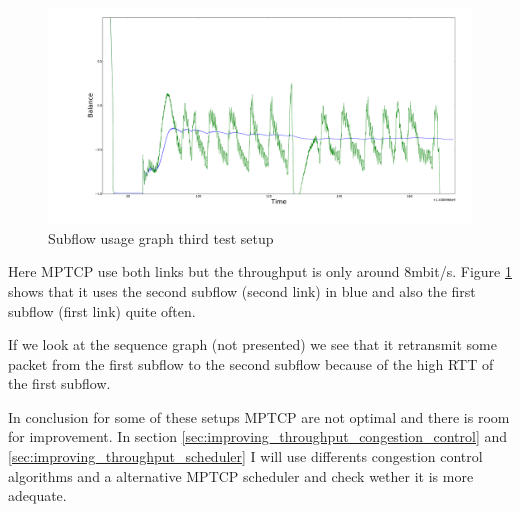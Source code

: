 \begin{figure}[h!]
 \centering
 \includegraphics[width=14cm]{../results/32_8-400_2rtt_seq2.pdf}
 \caption{Subflow usage graph third test setup}
 \label{32_8-400_2rtt_seq}
\end{figure}

Here MPTCP use both links but the throughput is only around 8mbit/s. Figure \ref{32_8-400_2rtt_seq} shows that it uses the second subflow (second link) in blue and
 also the first subflow (first link) quite often.

If we look at the sequence graph (not presented) we see that it retransmit some packet from the first subflow to the second subflow because of the high RTT of the first subflow.

In conclusion for some of these setups MPTCP are not optimal and there is room for improvement.
In section \ref{sec:improving_throughput_congestion_control} and \ref{sec:improving_throughput_scheduler}
I will use differents congestion control algorithms and a alternative MPTCP scheduler and check wether it is more adequate.
